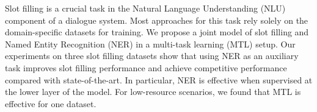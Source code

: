 Slot filling is a crucial task in the Natural Language Understanding (NLU) component of a dialogue system. Most approaches for this task rely solely on the domain-specific datasets for training. We propose a joint model of slot filling and Named Entity Recognition (NER) in a multi-task learning (MTL) setup. Our experiments on three slot filling datasets show that using NER as an auxiliary task improves slot filling performance and achieve competitive performance compared with state-of-the-art. In particular, NER is effective when supervised at the lower layer of the model. For  low-resource scenarios, we found that MTL is effective for one dataset.
